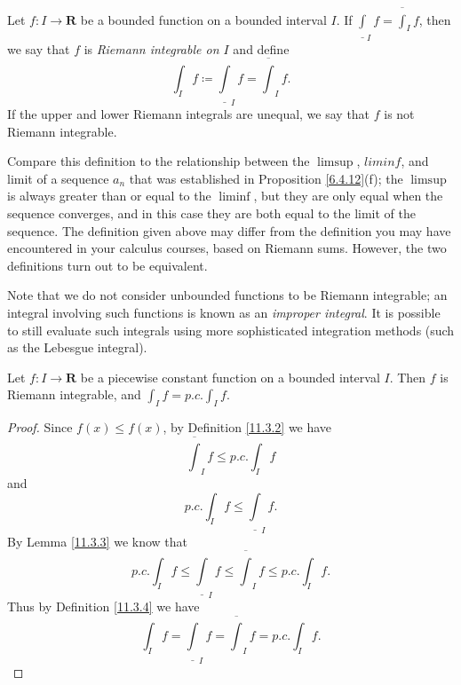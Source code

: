 \begin{definition}\label{11.3.4}
    Let \(f : I \to \mathbf{R}\) be a bounded function on a bounded interval \(I\).
    If \(\underline{\int}_I f = \overline{\int}_I f\), then we say that \(f\) is \emph{Riemann integrable on \(I\)} and define
    \[
        \int_I f \coloneqq \underline{\int}_I f = \overline{\int}_I f.
    \]
    If the upper and lower Riemann integrals are unequal, we say that \(f\) is not Riemann integrable.
\end{definition}

\begin{remark}\label{11.3.5}
    Compare this definition to the relationship between the \(\limsup\), \(liminf\), and limit of a sequence \(a_n\) that was established in Proposition \ref{6.4.12}(f);
    the \(\limsup\) is always greater than or equal to the \(\liminf\), but they are only equal when the sequence converges, and in this case they are both equal to the limit of the sequence.
    The definition given above may differ from the definition you may have encountered in your calculus courses, based on Riemann sums.
    However, the two definitions turn out to be equivalent.
\end{remark}

\begin{remark}\label{11.3.6}
    Note that we do not consider unbounded functions to be Riemann integrable;
    an integral involving such functions is known as an \emph{improper integral}.
    It is possible to still evaluate such integrals using more sophisticated integration methods (such as the Lebesgue integral).
\end{remark}

\begin{lemma}\label{11.3.7}
    Let \(f : I \to \mathbf{R}\) be a piecewise constant function on a bounded interval \(I\).
    Then \(f\) is Riemann integrable, and \(\int_I f = p.c. \int_I f\).
\end{lemma}

\begin{proof}
    Since \(f(x) \leq f(x)\), by Definition \ref{11.3.2} we have
    \[
        \overline{\int}_I f \leq p.c. \int_I f
    \]
    and
    \[
        p.c. \int_I f \leq \underline{\int}_I f.
    \]
    By Lemma \ref{11.3.3} we know that
    \[
        p.c. \int_I f \leq \underline{\int}_I f \leq \overline{\int}_I f \leq p.c. \int_I f.
    \]
    Thus by Definition \ref{11.3.4} we have
    \[
        \int_I f = \underline{\int}_I f = \overline{\int}_I f = p.c. \int_I f.
    \]
\end{proof}